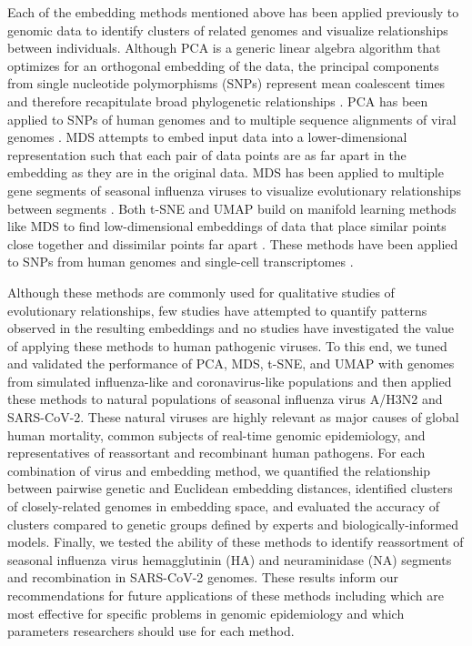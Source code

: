 \documentclass[10pt,letterpaper]{article}
\begin{document}
Each of the embedding methods mentioned above has been applied previously to genomic data to identify clusters of related genomes and visualize relationships between individuals.
Although PCA is a generic linear algebra algorithm that optimizes for an orthogonal embedding of the data, the principal components from single nucleotide polymorphisms (SNPs) represent mean coalescent times and therefore recapitulate broad phylogenetic relationships \cite{mcvean_2009}.
PCA has been applied to SNPs of human genomes \cite{novembre_2008,alexander_2009,mcvean_2009,auton_2015} and to multiple sequence alignments of viral genomes \cite{metsky_2017}.
MDS attempts to embed input data into a lower-dimensional representation such that each pair of data points are as far apart in the embedding as they are in the original data.
MDS has been applied to multiple gene segments of seasonal influenza viruses to visualize evolutionary relationships between segments \cite{rambaut_2008}.
Both t-SNE and UMAP build on manifold learning methods like MDS to find low-dimensional embeddings of data that place similar points close together and dissimilar points far apart \cite{kobak_2021}.
These methods have been applied to SNPs from human genomes \cite{diaz-papkovich_2019} and single-cell transcriptomes \cite{becht_2018,kobak_2019}.

Although these methods are commonly used for qualitative studies of evolutionary relationships, few studies have attempted to quantify patterns observed in the resulting embeddings and no studies have investigated the value of applying these methods to human pathogenic viruses.
To this end, we tuned and validated the performance of PCA, MDS, t-SNE, and UMAP with genomes from simulated influenza-like and coronavirus-like populations and then applied these methods to natural populations of seasonal influenza virus A/H3N2 and SARS-CoV-2.
These natural viruses are highly relevant as major causes of global human mortality, common subjects of real-time genomic epidemiology, and representatives of reassortant and recombinant human pathogens.
For each combination of virus and embedding method, we quantified the relationship between pairwise genetic and Euclidean embedding distances, identified clusters of closely-related genomes in embedding space, and evaluated the accuracy of clusters compared to genetic groups defined by experts and biologically-informed models.
Finally, we tested the ability of these methods to identify reassortment of seasonal influenza virus hemagglutinin (HA) and neuraminidase (NA) segments and recombination in SARS-CoV-2 genomes.
These results inform our recommendations for future applications of these methods including which are most effective for specific problems in genomic epidemiology and which parameters researchers should use for each method.
\end{document}
